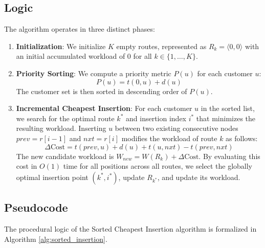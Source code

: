 \documentclass[11pt]{article}
\begin{document}
\subsection{Logic}
The algorithm operates in three distinct phases:
\begin{enumerate}
    \item \textbf{Initialization}: We initialize $K$ empty routes, represented as $R_k = \langle 0, 0 \rangle$ with an initial accumulated workload of $0$ for all $k \in \{1, \dots, K\}$.
    \item \textbf{Priority Sorting}: We compute a priority metric $P(u)$ for each customer $u$:
    \begin{equation}
        P(u) = t(0, u) + d(u)
    \end{equation}
    The customer set is then sorted in descending order of $P(u)$.
    \item \textbf{Incremental Cheapest Insertion}: For each customer $u$ in the sorted list, we search for the optimal route $k^*$ and insertion index $i^*$ that minimizes the resulting workload. 
    Inserting $u$ between two existing consecutive nodes $prev = r[i-1]$ and $nxt = r[i]$ modifies the workload of route $k$ as follows:
    \begin{equation}
        \Delta \text{Cost} = t(prev, u) + d(u) + t(u, nxt) - t(prev, nxt)
    \end{equation}
    The new candidate workload is $W_{new} = W(R_k) + \Delta \text{Cost}$. By evaluating this cost in $O(1)$ time for all positions across all routes, we select the globally optimal insertion point $(k^*, i^*)$, update $R_{k^*}$, and update its workload.
\end{enumerate}

\subsection{Pseudocode}
The procedural logic of the Sorted Cheapest Insertion algorithm is formalized in Algorithm \ref{alg:sorted_insertion}.
\end{document}
